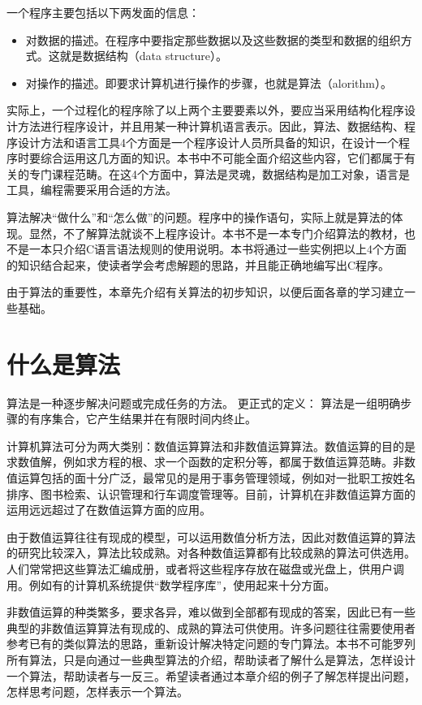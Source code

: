 一个程序主要包括以下两发面的信息：
\begin{itemize}
	\item 对数据的描述。在程序中要指定那些数据以及这些数据的类型和数据的组织方式。这就是数据结构（data structure）。
	\item 对操作的描述。即要求计算机进行操作的步骤，也就是算法（alorithm）。
\end{itemize}

实际上，一个过程化的程序除了以上两个主要要素以外，要应当采用结构化程序设计方法进行程序设计，并且用某一种计算机语言表示。因此，算法、数据结构、程序设计方法和语言工具4个方面是一个程序设计人员所具备的知识，在设计一个程序时要综合运用这几方面的知识。本书中不可能全面介绍这些内容，它们都属于有关的专门课程范畴。在这4个方面中，算法是灵魂，数据结构是加工对象，语言是工具，编程需要采用合适的方法。

算法解决“做什么”和“怎么做”的问题。程序中的操作语句，实际上就是算法的体现。显然，不了解算法就谈不上程序设计。本书不是一本专门介绍算法的教材，也不是一本只介绍C语言语法规则的使用说明。本书将通过一些实例把以上4个方面的知识结合起来，使读者学会考虑解题的思路，并且能正确地编写出C程序。

由于算法的重要性，本章先介绍有关算法的初步知识，以便后面各章的学习建立一些基础。

\section{什么是算法}

算法是一种逐步解决问题或完成任务的方法。
更正式的定义：
算法是一组明确步骤的有序集合，它产生结果并在有限时间内终止。

计算机算法可分为两大类别：数值运算算法和非数值运算算法。数值运算的目的是求数值解，例如求方程的根、求一个函数的定积分等，都属于数值运算范畴。非数值运算包括的面十分广泛，最常见的是用于事务管理领域，例如对一批职工按姓名排序、图书检索、认识管理和行车调度管理等。目前，计算机在非数值运算方面的运用远远超过了在数值运算方面的应用。

由于数值运算往往有现成的模型，可以运用数值分析方法，因此对数值运算的算法的研究比较深入，算法比较成熟。对各种数值运算都有比较成熟的算法可供选用。人们常常把这些算法汇编成册，或者将这些程序存放在磁盘或光盘上，供用户调用。例如有的计算机系统提供“数学程序库”，使用起来十分方面。

非数值运算的种类繁多，要求各异，难以做到全部都有现成的答案，因此已有一些典型的非数值运算算法有现成的、成熟的算法可供使用。许多问题往往需要使用者参考已有的类似算法的思路，重新设计解决特定问题的专门算法。本书不可能罗列所有算法，只是向通过一些典型算法的介绍，帮助读者了解什么是算法，怎样设计一个算法，帮助读者与一反三。希望读者通过本章介绍的例子了解怎样提出问题，怎样思考问题，怎样表示一个算法。

